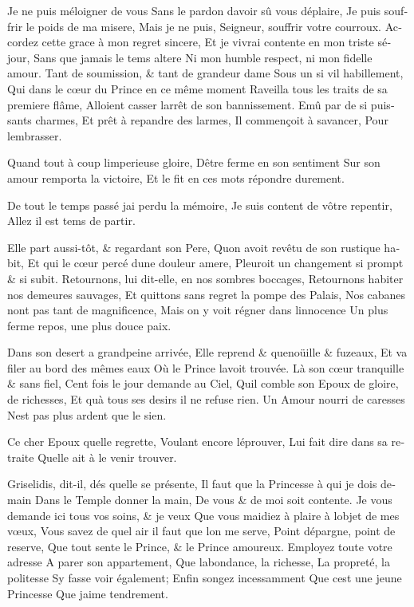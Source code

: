 \documentclass[14pt,a4paper]{memoir}
\begin{document}
\begin{otherlanguage}{french}
{Je ne puis m\textquotesingle éloigner de vous} {Sans le pardon
d\textquotesingle avoir sû vous déplaire,} {Je puis souffrir le poids de
ma misere,} {Mais je ne puis, Seigneur, souffrir votre courroux.}
{Accordez cette grace à mon regret sincere,} {Et je vivrai contente en
mon triste séjour,} {Sans que jamais le tems altere} {Ni mon humble
respect, ni mon fidelle amour.} {Tant de soumission, \& tant de grandeur
d\textquotesingle ame } {Sous un si vil habillement,} {Qui dans le cœur
du Prince en ce même moment} {Raveilla tous les traits de sa premiere
flâme,} {Alloient casser l\textquotesingle arrêt de son bannissement.}
{Emû par de si puissants charmes,} {Et prêt à repandre des larmes,} {Il
commençoit à s\textquotesingle avancer,} {Pour
l\textquotesingle embrasser.}

{Quand tout à coup l\textquotesingle imperieuse gloire,}
{D\textquotesingle être ferme en son sentiment} {Sur son amour remporta
la victoire,} {Et le fit en ces mots répondre durement.}

{De tout le temps passé j\textquotesingle ai perdu la mémoire,} {Je suis
content de vôtre repentir,} {Allez il est tems de partir.}

{Elle part aussi-tôt, \& regardant son Pere,} {Qu\textquotesingle on
avoit revêtu de son rustique habit,} {Et qui le cœur percé
d\textquotesingle une douleur amere, } {Pleuroit un changement si prompt
\& si subit. } {Retournons, lui dit-elle, en nos sombres boccages,}
{Retournons habiter nos demeures sauvages,} {Et quittons sans regret la
pompe des Palais,} {Nos cabanes n\textquotesingle ont pas tant de
magnificence,} {Mais on y voit régner dans l\textquotesingle innocence}
{Un plus ferme repos, une plus douce paix.}

{Dans son desert a grand\textquotesingle peine arrivée,} {Elle reprend
\& quenoüille \& fuzeaux,} {Et va filer au bord des mêmes eaux} {Où le
Prince l\textquotesingle avoit trouvée.} {Là son cœur tranquille \& sans
fiel,} {Cent fois le jour demande au Ciel,} {Qu\textquotesingle il
comble son Epoux de gloire, de richesses, } {Et qu\textquotesingle à
tous ses desirs il ne refuse rien.} {Un Amour nourri de caresses}
{N\textquotesingle est pas plus ardent que le sien.}

{Ce cher Epoux qu\textquotesingle elle regrette,} {Voulant encore
l\textquotesingle éprouver,} {Lui fait dire dans sa retraite}
{Qu\textquotesingle elle ait à le venir trouver.}

{Griselidis, dit-il, dés qu\textquotesingle elle se présente,} {Il faut
que la Princesse à qui je dois demain} {Dans le Temple donner la main,}
{De vous \& de moi soit contente.} {Je vous demande ici tous vos soins,
\& je veux } {Que vous m\textquotesingle aidiez à plaire à
l\textquotesingle objet de mes vœux,} {Vous savez de quel air il faut
que l\textquotesingle on me serve, } {Point d\textquotesingle épargne,
point de reserve,} {Que tout sente le Prince, \& le Prince amoureux.}
{Employez toute votre adresse} {A parer son appartement,} {Que
l\textquotesingle abondance, la richesse,} {La propreté, la politesse}
{S\textquotesingle y fasse voir également;} {Enfin songez incessamment}
{Que c\textquotesingle est une jeune Princesse} {Que
j\textquotesingle aime tendrement.}


\end{otherlanguage}
\end{document}
